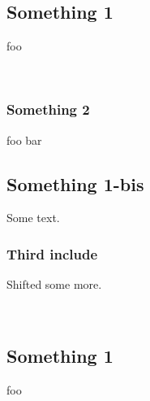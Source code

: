 \subsection{Something 1\label{something-1}}%
\begin{flushleft}\end{flushleft}%
foo

\label{container-page-test+u+package+++ml-module-Include+u+sections-val-foo}\\
\subsubsection{Something 2\label{something-2}}%
\label{container-page-test+u+package+++ml-module-Include+u+sections-val-bar}\begin{ocamlindent}\begin{flushleft}\end{flushleft}%
foo bar\end{ocamlindent}%
\medbreak
\subsection{Something 1-bis\label{something-1-bis}}%
\begin{flushleft}\end{flushleft}%
Some text.

\subsubsection{Third include\label{third-include}}%
\begin{flushleft}\end{flushleft}%
Shifted some more.

 \hyperref[container-page-test+u+package+++ml-module-Include+u+sections-module-type-Something]{}\label{container-page-test+u+package+++ml-module-Include+u+sections-val-something}\\
\subsection{Something 1\label{something-1}}%
\begin{flushleft}\end{flushleft}%
foo

\label{container-page-test+u+package+++ml-module-Include+u+sections-val-foo}\\
